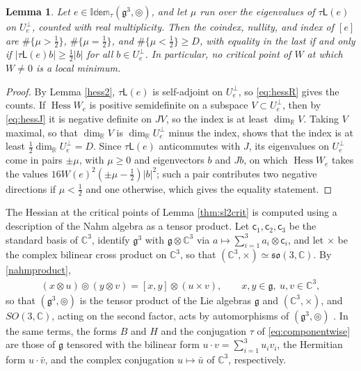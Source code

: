 \documentclass[leqno,10pt]{amsart}
\newtheorem{lemma}[theorem]{Lemma}%
\theoremstyle{definition}
\numberwithin{equation}{section}
\newcommand{\idem}{\mathbb{Idem}}
\newcommand{\so}{\mathfrak{so}}
\newcommand{\tmlt}{\circledcirc}
\newcommand{\hess}{\operatorname{Hess}}
\newcommand{\lin}{\mathsf{L}}
\newcommand{\g}{\mathfrak{g}}
\newcommand{\rea}{\mathbb R}
\newcommand{\com}{\mathbb C}
\newcommand{\nnorm}[1]{\lvert #1\rvert}%
\newcommand{\Usp}{U}
\newcommand{\Uperp}{\Usp^{\perp}}
\begin{document}
\begin{lemma}\label{lem:indexbound}
Let $e \in \idem_{\tau}(\g^{3}, \tmlt)$, and let $\mu$ run over the eigenvalues of $\tau\lin(e)$ on $\Uperp_{e}$, counted with real multiplicity. Then the coindex, nullity, and index of $[e]$ are $\#\{\mu > \tfrac{1}{2}\}$, $\#\{\mu = \tfrac{1}{2}\}$, and $\#\{\mu < \tfrac{1}{2}\} \geq D$, with equality in the last if and only if $\nnorm{\tau\lin(e)b} \geq \tfrac{1}{2}\nnorm{b}$ for all $b \in \Uperp_{e}$. In particular, no critical point of $W$ at which $W \neq 0$ is a local minimum.
\end{lemma}
\begin{proof}
By Lemma \ref{hess2}, $\tau\lin(e)$ is self-adjoint on $\Uperp_{e}$, so \eqref{eq:hessR} gives the counts. If $\hess W_{e}$ is positive semidefinite on a subspace $V \subset \Uperp_{e}$, then by \eqref{eq:hessJ} it is negative definite on $JV$, so the index is at least $\dim_{\rea}V$. Taking $V$ maximal, so that $\dim_{\rea}V$ is $\dim_{\rea}\Uperp_{e}$ minus the index, shows that the index is at least $\tfrac{1}{2}\dim_{\rea}\Uperp_{e} = D$. Since $\tau\lin(e)$ anticommutes with $J$, its eigenvalues on $\Uperp_{e}$ come in pairs $\pm\mu$, with $\mu \geq 0$ and eigenvectors $b$ and $Jb$, on which $\hess W_{e}$ takes the values $16W(e)^{2}(\pm\mu - \tfrac{1}{2})\nnorm{b}^{2}$; such a pair contributes two negative directions if $\mu < \tfrac{1}{2}$ and one otherwise, which gives the equality statement.
\end{proof}

The Hessian at the critical points of Lemma \ref{thm:sl2crit} is computed using a description of the Nahm algebra as a tensor product. Let $\mathsf{c}_{1}, \mathsf{c}_{2}, \mathsf{c}_{3}$ be the standard basis of $\com^{3}$, identify $\g^{3}$ with $\g \otimes \com^{3}$ via $a \mapsto \sum_{i=1}^{3}a_{i} \otimes \mathsf{c}_{i}$, and let $\times$ be the complex bilinear cross product on $\com^{3}$, so that $(\com^{3}, \times) \simeq \so(3, \com)$. By \eqref{nahmproduct},
\begin{align}\label{eq:nahmtensor}
(x \otimes u) \tmlt (y \otimes v) = [x, y] \otimes (u \times v), \qquad x, y \in \g,\ u, v \in \com^{3},
\end{align}
so that $(\g^{3}, \tmlt)$ is the tensor product of the Lie algebras $\g$ and $(\com^{3}, \times)$, and $SO(3, \com)$, acting on the second factor, acts by automorphisms of $(\g^{3}, \tmlt)$ \cite[Corollary~9.1]{Kinyon-Sagle}. In the same terms, the forms $B$ and $H$ and the conjugation $\tau$ of \eqref{eq:componentwise} are those of $\g$ tensored with the bilinear form $u \cdot v = \sum_{i=1}^{3}u_{i}v_{i}$, the Hermitian form $u \cdot \bar{v}$, and the complex conjugation $u \mapsto \bar{u}$ of $\com^{3}$, respectively.
\end{document}
